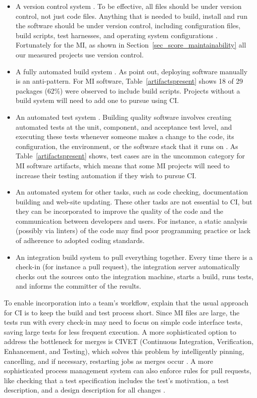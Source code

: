 \documentclass[final, 3p, times, authoryear]{elsarticle}
\begin{document}
\begin{itemize}
	\item A version control system \citep{Fowler2006}. To be effective, all
	files should be under version control, not just code files.  Anything that
	is needed to build, install and run the software should be under version
	control, including configuration files, build scripts, test harnesses, and
	operating system configurations \citep[p. 19]{HumbleAndFarley2010}.
	Fortunately for the MI, as shown in Section~\ref{sec_score_maintainability}
	all our measured projects use version control.
	\item A fully automated build system \citep{Fowler2006}.  As \citet[p.\
	5]{HumbleAndFarley2010} point out, deploying software manually is an
	anti-pattern.  For MI software, Table~\ref{artifactspresent} shows 18 of 29
	packages (62\%) were observed to include build scripts.  Projects without a
	build system will need to add one to pursue using CI.
	\item An automated test system \citep{Fowler2006}. Building quality software
	involves creating automated tests at the unit, component, and acceptance
	test level, and executing these tests whenever someone makes a change to the
	code, its configuration, the environment, or the software stack that it runs
	on \citep[p.\ 83]{HumbleAndFarley2010}. As Table~\ref{artifactspresent}
	shows, test cases are in the uncommon category for MI software artifacts,
	which means that some MI projects will need to increase their testing
	automation if they wish to pursue CI.
	\item An automated system for other tasks, such as code checking,
	documentation building and web-site updating.  These other tasks are not
	essential to CI, but they can be incorporated to improve the quality
	of the code and the communication between developers and users. For
	instance, a static analysis (possibly via linters) of the code may find poor
	programming practice or lack of adherence to adopted coding standards.
	\item An integration build system to pull everything together.  Every time
	there is a check-in (for instance a pull request), the integration server
	automatically checks out the sources onto the integration machine, starts a
	build, runs tests, and informs the committer of the results. 
\end{itemize}

To enable incorporation into a team's workflow, \citet[p.\
60]{HumbleAndFarley2010} explain that the usual approach for CI is to keep the
build and test process short. Since MI files are large, the tests run with every
check-in may need to focus on simple code interface tests, saving large tests
for less frequent execution.  A more sophisticated option to address the
bottleneck for merges is CIVET (Continuous Integration, Verification,
Enhancement, and Testing), which solves this problem by intelligently pinning,
cancelling, and if necessary, restarting jobs as merges occur
\citep{SlaughterEtAl2021}. A more sophisticated process management system can
also enforce rules for pull requests, like checking that a test specification
includes the test's motivation, a test description, and a design description for
all changes \citet{SlaughterEtAl2021}. 
\end{document}
